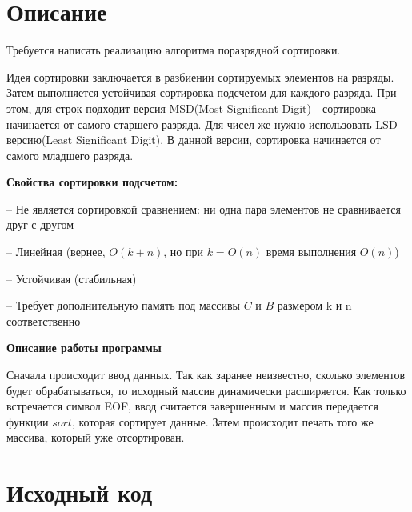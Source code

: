 \section{Описание}

Требуется написать реализацию алгоритма поразрядной сортировки.

Идея сортировки заключается в разбиении сортируемых элементов на разряды. Затем выполняется устойчивая сортировка подсчетом для каждого разряда. При этом, для строк подходит версия MSD(Most Significant Digit) - сортировка начинается от самого старшего разряда. Для чисел же нужно использовать LSD-версию(Least Significant Digit). В данной версии, сортировка начинается от самого младшего разряда.

{\bf Свойства сортировки подсчетом:}

	-- Не является сортировкой сравнением: ни одна пара
элементов не сравнивается друг с другом

	-- Линейная (вернее, $O(k + n)$, но при $k = O(n)$ время
выполнения $O(n)$)

	-- Устойчивая (стабильная)
	
	-- Требует дополнительную память под массивы $C$ и $B$
размером k и n соответственно

{\bf Описание работы программы}

Сначала происходит ввод данных. Так как заранее неизвестно, сколько элементов будет обрабатываться, то исходный массив динамически расширяется. Как только встречается символ EOF, ввод считается завершенным и массив передается функции $sort$, которая сортирует данные. Затем происходит печать того же массива, который уже отсортирован. 
\pagebreak

\section{Исходный код}

